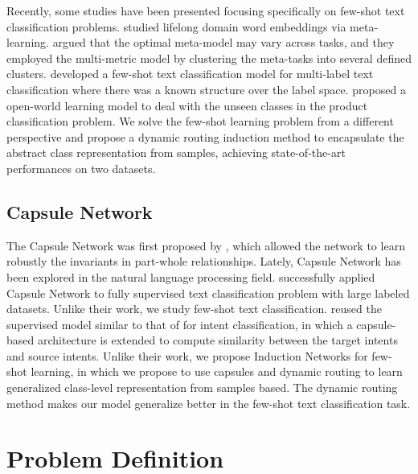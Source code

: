 \documentclass[11pt,a4paper]{article}
\begin{document}
Recently, some studies have been presented focusing specifically on few-shot text classification problems. \citet{xu2018lifelong} studied lifelong domain word embeddings via meta-learning. \citet{yu2018diverse} argued that the optimal meta-model may vary across tasks, and they employed the multi-metric model by clustering the meta-tasks into several defined clusters. \citet{rios2018few} developed a few-shot text classification model for multi-label text classification where there was a known structure over the label space. \citet{xu2019open} proposed a open-world learning model to deal with the unseen classes in the product classification problem. We solve the few-shot learning problem from a different perspective and propose a dynamic routing induction method to encapsulate the abstract class representation from samples, achieving state-of-the-art performances on two datasets.

\subsection{Capsule Network}
The Capsule Network was first proposed by \citet{sabour2017dynamic}, which allowed the network to learn robustly the invariants in part-whole relationships. Lately, Capsule Network has been explored in the natural language processing field. \citet{zhao2018investigating} successfully applied Capsule Network to fully supervised text classification problem with large labeled datasets. Unlike their work, we study few-shot text classification. \citet{xia2018zero} reused the supervised model similar to that of \citet{zhao2018investigating} for intent classification, in which a capsule-based architecture is extended to compute similarity between the target intents and source intents. Unlike their work, we propose Induction Networks for few-shot learning, in which we propose to use capsules and dynamic routing to learn generalized class-level representation from samples based. The dynamic routing method makes our model generalize better in the few-shot text classification task. 









\section{Problem Definition}
\end{document}

